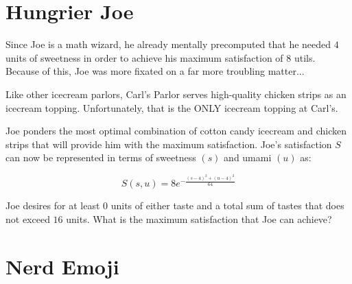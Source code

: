 
\setcounter{chapter}{2}
\chapter{Hungrier Joe}
Since Joe is a math wizard, he already mentally precomputed that he needed $4$ units of sweetness in order to achieve his maximum satisfaction of $8$ utils.
Because of this, Joe was more fixated on a far more troubling matter...

Like other icecream parlors, Carl's Parlor serves high-quality chicken strips as an icecream topping.
Unfortunately, that is the ONLY icecream topping at Carl's.

Joe ponders the most optimal combination of cotton candy icecream and chicken strips that will provide him with the maximum satisfaction.
Joe's satisfaction $S$ can now be represented in terms of sweetness $(s)$ and umami $(u)$ as:\par
\Large
\begin{equation}
	S(s, u) = 8e^{-\frac{(s-4)^2+(u-4)^2}{64}}
\end{equation}
\normalsize
\begin{eg}
	Joe desires for at least $0$ units of either taste and a total sum of tastes that does not exceed $16$ units. What is the maximum satisfaction that Joe can achieve?
\end{eg}

\setcounter{chapter}{3}
\chapter{Nerd Emoji} %
